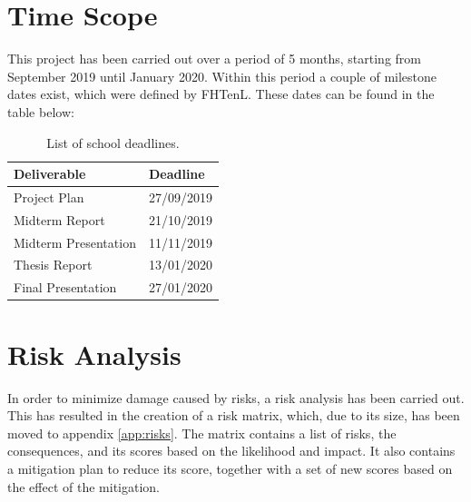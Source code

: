\pagebreak
\section{Time Scope}
This project has been carried out over a period of 5 months, starting from September 2019 until January 2020. Within this period a couple of milestone dates exist, which were defined by \gls{FHTenL}. These dates can be found in the table below:
\begin{table}[h]
	\centering
	\begin{tabular}{|l|l|}
		\hline
		\textbf{Deliverable} & \textbf{Deadline} \\ \hline
		Project Plan & 27/09/2019 \\
		Midterm Report & 21/10/2019 \\
		Midterm Presentation & 11/11/2019 \\
		Thesis Report & 13/01/2020 \\
		Final Presentation & 27/01/2020 \\ \hline
	\end{tabular}
	\caption{List of school deadlines.}
	\label{tab:deadlines}
\end{table}

\section{Risk Analysis}
In order to minimize damage caused by risks, a risk analysis has been carried out. This has resulted in the creation of a risk matrix, which, due to its size, has been moved to appendix \ref{app:risks}. The matrix contains a list of risks, the consequences, and its scores based on the likelihood and impact. It also contains a mitigation plan to reduce its score, together with a set of new scores based on the effect of the mitigation.

